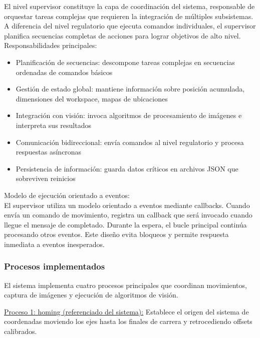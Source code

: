 El nivel supervisor constituye la capa de coordinación del sistema, responsable de orquestar tareas complejas que requieren la integración de múltiples subsistemas. A diferencia del nivel regulatorio que ejecuta comandos individuales, el supervisor planifica secuencias completas de acciones para lograr objetivos de alto nivel.\\

Responsabilidades principales:

\begin{itemize}[label=$\bullet$]
    \item Planificación de secuencias: descompone tareas complejas en secuencias ordenadas de comandos básicos
    \item Gestión de estado global: mantiene información sobre posición acumulada, dimensiones del workspace, mapas de ubicaciones
    \item Integración con visión: invoca algoritmos de procesamiento de imágenes e interpreta sus resultados
    \item Comunicación bidireccional: envía comandos al nivel regulatorio y procesa respuestas asíncronas
    \item Persistencia de información: guarda datos críticos en archivos JSON que sobreviven reinicios
\end{itemize}

Modelo de ejecución orientado a eventos:\\
\noindent
El supervisor utiliza un modelo orientado a eventos mediante callbacks. Cuando envía un comando de movimiento, registra un callback que será invocado cuando llegue el mensaje de completado. Durante la espera, el bucle principal continúa procesando otros eventos. Este diseño evita bloqueos y permite respuesta inmediata a eventos inesperados.

\subsubsection{Procesos implementados}

El sistema implementa cuatro procesos principales que coordinan movimientos, captura de imágenes y ejecución de algoritmos de visión.

\underline{Proceso 1: homing (referenciado del sistema):} Establece el origen del sistema de coordenadas moviendo los ejes hasta los finales de carrera y retrocediendo offsets calibrados.


